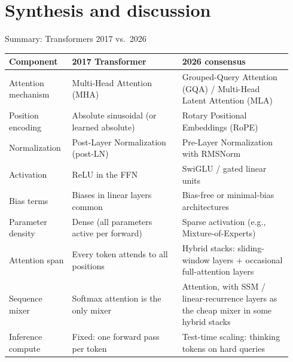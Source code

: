 \section{Synthesis and discussion}

\begin{frame}[t]{Summary: Transformers 2017 vs.\ 2026}
  \footnotesize
  \vspace{-0.2em}
  \begin{center}
    \renewcommand{\arraystretch}{1.25}
    \begin{tabular}{@{}>{\raggedright\arraybackslash}p{0.20\linewidth}>{\raggedright\arraybackslash}p{0.37\linewidth}>{\raggedright\arraybackslash}p{0.37\linewidth}@{}}
      \textbf{Component} & \textbf{2017 Transformer} & \textbf{2026 consensus} \\
      \hline
      Attention mechanism & Multi-Head Attention (MHA) & Grouped-Query Attention (GQA) / Multi-Head Latent Attention (MLA) \\
      \hline
      Position encoding & Absolute sinusoidal (or learned absolute) & Rotary Positional Embeddings (RoPE) \\
      \hline
      Normalization & Post-Layer Normalization (post-LN) & Pre-Layer Normalization with RMSNorm \\
      \hline
      Activation & ReLU in the FFN & SwiGLU / gated linear units \\
      \hline
      Bias terms & Biases in linear layers common & Bias-free or minimal-bias architectures \\
      \hline
      Parameter density & Dense (all parameters active per forward) & Sparse activation (e.g., Mixture-of-Experts) \\
      \hline
      Attention span & Every token attends to all positions & Hybrid stacks: sliding-window layers + occasional full-attention layers \\
      \hline
      Sequence mixer & Softmax attention is the only mixer & Attention, with SSM / linear-recurrence layers as the cheap mixer in some hybrid stacks \\
      \hline
      Inference compute & Fixed: one forward pass per token & Test-time scaling: thinking tokens on hard queries \\
      \hline
    \end{tabular}
  \end{center}
\end{frame}

